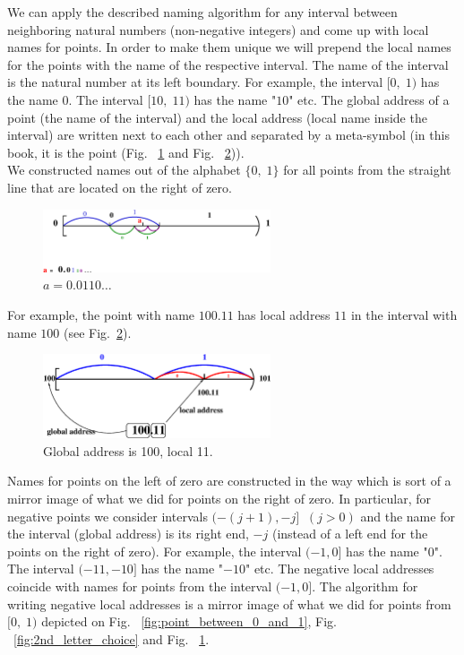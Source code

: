 \documentclass[color=black,11pt]{elegantpaper}
\begin{document}
We can apply the described naming algorithm for any interval between neighboring natural numbers (non-negative integers) and come up with local names for points. In order to make them unique we will prepend the local names for the points with the name of the respective interval. The name of the interval is the natural number at its left boundary. For example, the interval $[0,\;1)$ has the name $0.$ The interval $[10,\;11)$ has the name "$10$" etc. The global address of a point (the name of the interval) and the local address (local name inside the interval) are written next to each other and separated by a meta-symbol (in this book, it is the point (Fig. ~\ref{fig:complete_address_a} and Fig. ~\ref{fig:globallocaladdress})).\\ 

We constructed names out of the alphabet $\{0,\;1\}$ for all points from the straight line that are located on the right of zero.\\
\begin{figure}[htbp]
  \centering
  \includegraphics[width=0.6\textwidth]{xfig_stuff/CompleteAddress.eps}
  \caption{$a = 0.0110\dots$}
  \label{fig:complete_address_a}
\end{figure}
For example, the point with name $100.11$ has local address $11$ in the interval with name $100$ (see Fig.~\ref{fig:globallocaladdress}). 
\begin{figure}[htbp]
  \centering
  \includegraphics[width=0.6\textwidth]{xfig_stuff/globallocaladdress.eps}
  \caption{Global address is 100, local 11.}
  \label{fig:globallocaladdress}
\end{figure}
 Names for points on the left of zero are constructed in the way which is sort of a mirror image of what we did for points on the right of zero. In particular, for negative points we consider intervals $(-(j+1),-j]\;\;( j>0)$ and the name for the interval (global address) is its right end, $-j $ (instead of a left end for the points on the right of zero). For example, the interval $(-1,0]$ has the name "$0$". The interval $(-11,-10]$ has the name "$-10$" etc. The negative local addresses coincide with names for points from the interval $(-1,0].$ The algorithm for writing negative local addresses is a mirror image of what we did for points from $[0,\;1)$ depicted on Fig. ~\ref{fig:point_between_0_and_1}, Fig. ~\ref{fig:2nd_letter_choice} and Fig. ~\ref{fig:complete_address_a}. 
\end{document}
